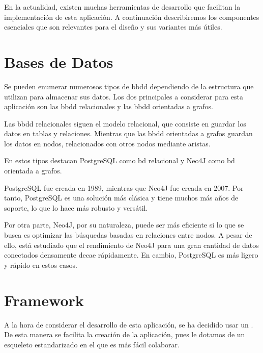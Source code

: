   En la actualidad, existen muchas herramientas de desarrollo que facilitan la implementación de esta aplicación. A continuación describiremos los componentes esenciales que son relevantes para el diseño y sus variantes más útiles.

\section{Bases de Datos}
  Se pueden enumerar numerosos tipos de \ac{bbdd} dependiendo de la estructura que utilizan para almacenar sus datos. Los dos principales a considerar para esta aplicación son las \ac{bbdd} relacionales y las \ac{bbdd} orientadas a grafos.
  
  Las \ac{bbdd} relacionales siguen el modelo relacional, que consiste en guardar los datos en tablas y relaciones. Mientras que las \ac{bbdd} orientadas a grafos guardan los datos en nodos, relacionados con otros nodos mediante aristas.
  
  En estos tipos destacan PostgreSQL\cite{postgres} como \ac{bd} relacional y Neo4J\cite{neo4j} como \ac{bd} orientada a grafos.
  
  PostgreSQL fue creada en 1989, mientras que Neo4J fue creada en 2007. Por tanto, PostgreSQL es una solución más clásica y tiene muchos más años de soporte, lo que lo hace más robusto y versátil.

  Por otra parte, Neo4J, por su naturaleza, puede ser más eficiente si lo que se busca es optimizar las búsquedas basadas en relaciones entre nodos. A pesar de ello, está estudiado que el rendimiento de Neo4J para una gran cantidad de datos conectados densamente decae rápidamente. En cambio, PostgreSQL es más ligero y rápido en estos casos.
  
\section{Framework}
  A la hora de considerar el desarrollo de esta aplicación, se ha decidido usar un . De esta manera se facilita la creación de la aplicación, pues le dotamos de un esqueleto estandarizado en el que es más fácil colaborar.
  
